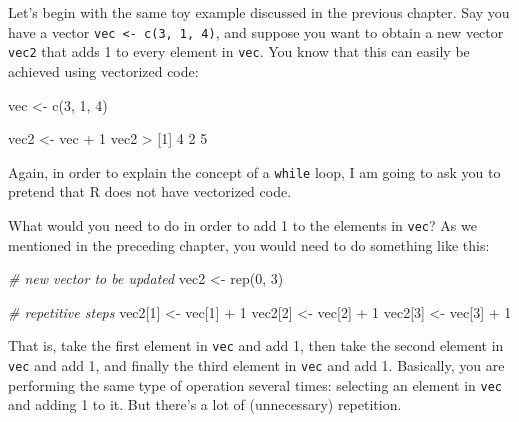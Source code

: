 \documentclass[
]{book}
\newenvironment{Shaded}{\begin{snugshade}}{\end{snugshade}}
\newcommand{\CommentTok}[1]{\textcolor[rgb]{0.56,0.35,0.01}{\textit{#1}}}
\newcommand{\DecValTok}[1]{\textcolor[rgb]{0.00,0.00,0.81}{#1}}
\newcommand{\FunctionTok}[1]{\textcolor[rgb]{0.00,0.00,0.00}{#1}}
\newcommand{\NormalTok}[1]{#1}
\newcommand{\OtherTok}[1]{\textcolor[rgb]{0.56,0.35,0.01}{#1}}
\newcommand{\SpecialCharTok}[1]{\textcolor[rgb]{0.00,0.00,0.00}{#1}}
\begin{document}
Let's begin with the same toy example discussed in the previous chapter.
Say you have a vector \texttt{vec\ \textless{}-\ c(3,\ 1,\ 4)}, and suppose you want to obtain a new
vector \texttt{vec2} that adds 1 to every element in \texttt{vec}. You know that this can
easily be achieved using vectorized code:

\begin{Shaded}
\begin{Highlighting}[]
\NormalTok{vec }\OtherTok{\textless{}{-}} \FunctionTok{c}\NormalTok{(}\DecValTok{3}\NormalTok{, }\DecValTok{1}\NormalTok{, }\DecValTok{4}\NormalTok{) }

\NormalTok{vec2 }\OtherTok{\textless{}{-}}\NormalTok{ vec }\SpecialCharTok{+} \DecValTok{1}
\NormalTok{vec2}
\SpecialCharTok{\textgreater{}}\NormalTok{ [}\DecValTok{1}\NormalTok{] }\DecValTok{4} \DecValTok{2} \DecValTok{5}
\end{Highlighting}
\end{Shaded}

Again, in order to explain the concept of a \texttt{while} loop, I am going to ask
you to pretend that R does not have vectorized code.

What would you need to do in order to add 1 to the elements in \texttt{vec}? As we
mentioned in the preceding chapter, you would need to do something like this:

\begin{Shaded}
\begin{Highlighting}[]
\CommentTok{\# new vector to be updated}
\NormalTok{vec2 }\OtherTok{\textless{}{-}} \FunctionTok{rep}\NormalTok{(}\DecValTok{0}\NormalTok{, }\DecValTok{3}\NormalTok{)}

\CommentTok{\# repetitive steps}
\NormalTok{vec2[}\DecValTok{1}\NormalTok{] }\OtherTok{\textless{}{-}}\NormalTok{ vec[}\DecValTok{1}\NormalTok{] }\SpecialCharTok{+} \DecValTok{1}
\NormalTok{vec2[}\DecValTok{2}\NormalTok{] }\OtherTok{\textless{}{-}}\NormalTok{ vec[}\DecValTok{2}\NormalTok{] }\SpecialCharTok{+} \DecValTok{1}
\NormalTok{vec2[}\DecValTok{3}\NormalTok{] }\OtherTok{\textless{}{-}}\NormalTok{ vec[}\DecValTok{3}\NormalTok{] }\SpecialCharTok{+} \DecValTok{1}
\end{Highlighting}
\end{Shaded}

That is, take the first element in \texttt{vec} and add 1, then take the second element
in \texttt{vec} and add 1, and finally the third element in \texttt{vec} and add 1. Basically,
you are performing the same type of operation several times: selecting an
element in \texttt{vec} and adding 1 to it. But there's a lot of (unnecessary) repetition.
\end{document}
